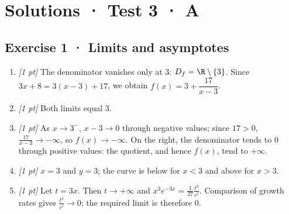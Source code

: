 \ifmxteacher\mxnewpage

\section*{Solutions · Test 3 · A}\label{cor:4-3}

\subsection*{Exercise 1 · Limits and asymptotes}\begin{enumerate}

\item \textit{[1 pt]} The denominator vanishes only at $3$: $D_f=\R\setminus\{3\}$. Since $3x+8=3(x-3)+17$, we obtain $f(x)=3+\dfrac{17}{x-3}$.

\item \textit{[1 pt]} Both limits equal $3$.

\item \textit{[1 pt]} As $x\to 3^-$, $x-3\to0$ through negative values; since $17>0$, $\frac{17}{x-3}\to-\infty$, so $f(x)\to-\infty$. On the right, the denominator tends to $0$ through positive values: the quotient, and hence $f(x)$, tend to $+\infty$.

\item \textit{[1 pt]} $x=3$ and $y=3$; the curve is below for $x<3$ and above for $x>3$.

\item \textit{[1 pt]} Let $t=3x$. Then $t\to+\infty$ and $x^3e^{-3x}=\frac{1}{27}\frac{t^3}{e^t}$. Comparison of growth rates gives $\frac{t^3}{e^t}\to0$; the required limit is therefore $0$.

\end{enumerate}

